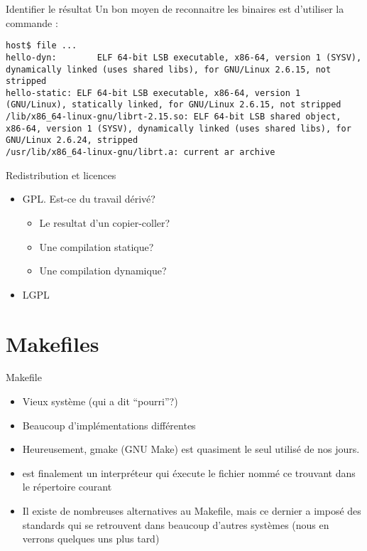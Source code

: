 \begin{frame}[fragile=singleslide]{Identifier le résultat}
  Un bon moyen de reconnaitre  les binaires est d'utiliser la commande
  :
  \begin{lstlisting}
host$ file ...
hello-dyn:        ELF 64-bit LSB executable, x86-64, version 1 (SYSV), dynamically linked (uses shared libs), for GNU/Linux 2.6.15, not stripped
hello-static: ELF 64-bit LSB executable, x86-64, version 1 (GNU/Linux), statically linked, for GNU/Linux 2.6.15, not stripped
/lib/x86_64-linux-gnu/librt-2.15.so: ELF 64-bit LSB shared object, x86-64, version 1 (SYSV), dynamically linked (uses shared libs), for GNU/Linux 2.6.24, stripped
/usr/lib/x86_64-linux-gnu/librt.a: current ar archive
\end{lstlisting} %
\end{frame}

\begin{frame}[fragile=singleslide]{Redistribution et licences}
  \begin{itemize}
  \item GPL. Est-ce du travail dérivé?
    \begin{itemize}
    \item Le resultat d'un copier-coller?
    \item Une compilation statique?
    \item Une compilation dynamique?
    \end{itemize}
  \item LGPL
  \end{itemize}
\end{frame}

\section{Makefiles}

\begin{frame}[fragile=singleslide]{Makefile}
  \begin{itemize}
  \item Vieux système (qui a dit ``pourri''?)
  \item Beaucoup d'implémentations différentes
  \item Heureusement,  gmake (GNU Make) est quasiment  le seul utilisé
    de nos jours.
  \item  {}  est finalement  un  interpréteur  qui éxecute  le
    fichier  nommé    ce  trouvant dans  le  répertoire
    courant
  \item  Il existe  de nombreuses  alternatives au  Makefile,  mais ce
    dernier  a imposé des  standards qui  se retrouvent  dans beaucoup
    d'autres systèmes (nous en verrons quelques uns plus tard)
  \end{itemize}
\end{frame}

